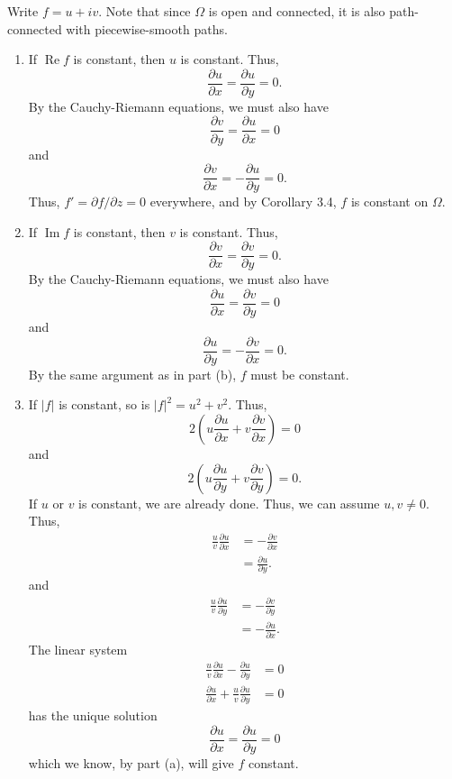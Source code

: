 \documentclass[12 pt, letterpaper]{hmcpset}
\begin{document}
\begin{solution}
	Write $f = u + iv$. Note that since $\Omega$ is open and connected, it is also path-connected with piecewise-smooth paths.
	\begin{enumerate}
		\item If $\operatorname{Re} f$ is constant, then $u$ is constant. Thus,
			 \[
				\frac{\partial u}{\partial x} = \frac{\partial u}{\partial y} = 0.
			\]
			By the Cauchy-Riemann equations, we must also have
			\[
				\frac{\partial v}{\partial y} = \frac{\partial u}{\partial x} = 0
			\]
			and
			\[
				\frac{\partial v}{\partial x} = - \frac{\partial u}{\partial y} = 0.
			\]
			Thus, $f' = {\partial f}/{\partial z} = 0$ everywhere, and by Corollary 3.4, $f$ is constant on  $\Omega$.
		\item If $\operatorname{Im} f$ is constant, then $v$ is constant. Thus,
			 \[
				\frac{\partial v}{\partial x} = \frac{\partial v}{\partial y} = 0.
			\]
			By the Cauchy-Riemann equations, we must also have
			\[
				\frac{\partial u}{\partial x} = \frac{\partial v}{\partial y} = 0
			\]
			and
			\[
				\frac{\partial u}{\partial y} = - \frac{\partial v}{\partial x} = 0.
			\]
			By the same argument as in part (b), $f$ must be constant.
		\item If $\lvert f \rvert$ is constant, so is $\lvert f \rvert^{2} = u^{2} + v^{2}$. Thus, 
			\[
				2 \left ( u \frac{\partial u}{\partial x} + v \frac{\partial v}{\partial x} \right ) = 0
			\]
			and
			\[
				2 \left ( u \frac{\partial u}{\partial y} + v \frac{\partial v}{\partial y} \right ) = 0.
			\]
			If $u$ or $v$ is constant, we are already done. Thus, we can assume $u, v \neq 0$. Thus,
			\[
				\begin{split}
					\frac{u}{v} \frac{\partial u}{\partial x} & = - \frac{\partial v}{\partial x} \\
										  & = \frac{\partial u}{\partial y}.
				\end{split}
			\]
			and
			\[
				\begin{split}
					\frac{u}{v} \frac{\partial u}{\partial y} & = - \frac{\partial v}{\partial y} \\
										  & = - \frac{\partial u}{\partial x}.
				\end{split}
			\]
			The linear system
			\begin{align*}
				\frac{u}{v} \frac{\partial u}{\partial x} - \frac{\partial u}{\partial y} & = 0 \\
				\frac{\partial u}{\partial x} + \frac{u}{v} \frac{\partial u}{\partial y} & = 0
			\end{align*}
			has the unique solution
			\[
				\frac{\partial u}{\partial x} = \frac{\partial u}{\partial y} = 0
			\]
			which we know, by part (a), will give $f$ constant.
	\end{enumerate}
\end{solution}
\end{document}
